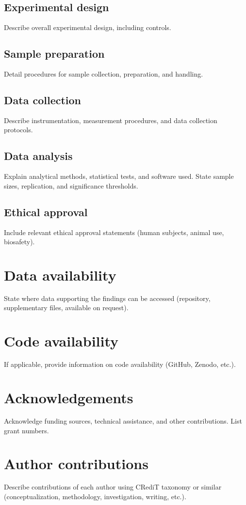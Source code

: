 \documentclass[12pt]{article}
\begin{document}
\subsection*{Experimental design}
Describe overall experimental design, including controls.

\subsection*{Sample preparation}
Detail procedures for sample collection, preparation, and handling.

\subsection*{Data collection}
Describe instrumentation, measurement procedures, and data collection protocols.

\subsection*{Data analysis}
Explain analytical methods, statistical tests, and software used. State sample sizes, replication, and significance thresholds.

\subsection*{Ethical approval}
Include relevant ethical approval statements (human subjects, animal use, biosafety).

\section*{Data availability}
State where data supporting the findings can be accessed (repository, supplementary files, available on request).

\section*{Code availability}
If applicable, provide information on code availability (GitHub, Zenodo, etc.).

\section*{Acknowledgements}
Acknowledge funding sources, technical assistance, and other contributions. List grant numbers.

\section*{Author contributions}
Describe contributions of each author using CRediT taxonomy or similar (conceptualization, methodology, investigation, writing, etc.).
\end{document}
